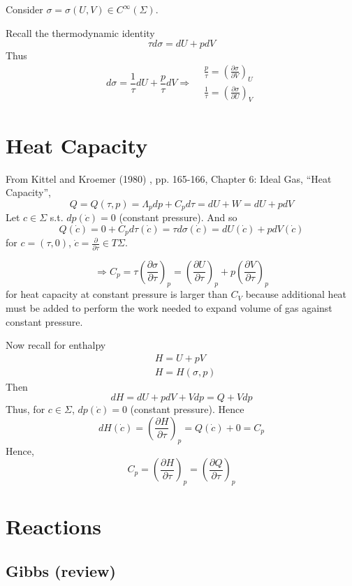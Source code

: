 \documentclass[10pt]{amsart}
\begin{document}
\begin{multicols*}{2}
Consider $\sigma = \sigma(U,V) \in C^{\infty}(\Sigma)$.  

Recall the thermodynamic identity 
\[
\tau d\sigma = dU + pdV
\]
Thus
\[
d\sigma = \frac{1}{\tau} dU + \frac{p}{\tau} dV \Longrightarrow \begin{aligned} & \frac{p}{\tau} = \left( \frac{ \partial \sigma}{ \partial V} \right)_U \\
  & \frac{1}{\tau}  =\left( \frac{ \partial \sigma}{ \partial U} \right)_V \end{aligned}
\]

\section{Heat Capacity}

From Kittel and Kroemer (1980) \cite{CKittelHKroemer1980}, pp. 165-166, Chapter 6: Ideal Gas, ``Heat Capacity'',
\[
Q = Q(\tau,p) = \Lambda_p dp + C_p d\tau = dU + W = dU + p dV 
\]
Let $c\in \Sigma$ s.t. $dp(\dot{c})=0$ (constant pressure).  And so 
\[
Q(\dot{c}) = 0 + C_p d\tau(\dot{c}) = \tau d\sigma (\dot{c}) = dU(\dot{c}) + pdV(\dot{c})
\]
for $c=(\tau,0)$, $\dot{c} = \frac{\partial }{ \partial \tau} \in T\Sigma$.  

\[
\Longrightarrow C_p = \tau \left( \frac{ \partial \sigma }{ \partial \tau} \right)_p = \left( \frac{ \partial U}{ \partial \tau} \right)_p + p \left( \frac{ \partial V}{ \partial \tau} \right)_p
\]
for heat capacity at constant pressure is larger than $C_V$ because additional heat must be added to perform the work needed to expand volume of gas against constant pressure.  

Now recall for enthalpy 
\[
\begin{aligned}
  & H = U+ pV \\ 
  & H = H(\sigma, p)
\end{aligned}
\]
Then
\[
dH = dU+ pdV + Vdp = Q + Vdp 
\]
Thus, for $c\in \Sigma$, $dp(\dot{c})=0$ (constant pressure).  Hence
\[
dH(\dot{c}) = \left( \frac{ \partial H}{ \partial \tau} \right)_p = Q(\dot{c})  +  0 = C_p
\]
Hence, 
\[
C_p = \left( \frac{ \partial H}{ \partial \tau } \right)_p = \left( \frac{ \partial Q}{ \partial \tau} \right)_p
\]


\section{Reactions}

\subsection{Gibbs (review)}


\end{multicols*}
\end{document}
